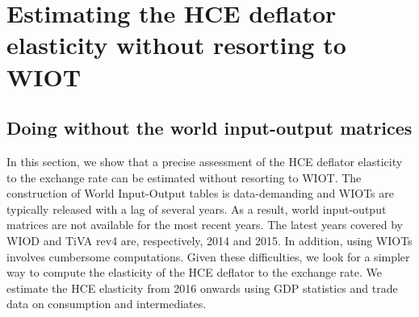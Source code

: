 \documentclass[12pt,a4paper]{paper}
\begin{document}
%
%
%
%
%

\section{Estimating the HCE deflator elasticity without resorting to WIOT}
\label{sec:extrapo}
\subsection{Doing without the world input-output matrices}
In this section, we show that a precise assessment of the HCE deflator elasticity to the exchange rate can be estimated without resorting to WIOT. 
The construction of World Input-Output tables is data-demanding and WIOTs are typically released with a lag of several years.
As a result, world input-output matrices are not available for the most recent years.
The latest years covered by WIOD and TiVA rev4 are, respectively, 2014 and 2015. 
In addition, using WIOTs involves cumbersome computations.
Given these difficulties, we look for a simpler way to compute the elasticity of the HCE deflator to the exchange rate.
We estimate the HCE elasticity from 2016 onwards using GDP statistics and trade data on consumption and intermediates.\\
\end{document}
